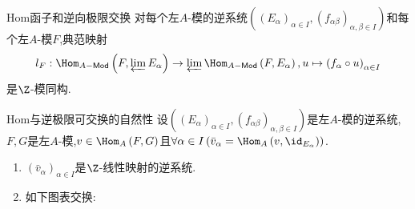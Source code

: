 \begin{proposition}{Hom函子和逆向极限交换}{}
	对每个左$A$-模的逆系统$\left(\left(E_{\alpha}\right)_{\alpha\in I},\left(f_{\alpha\beta}\right)_{\alpha,\beta\in I}\right)$和每个左$A$-模$F$,典范映射
	\begin{align*}
		l_{F}:\Hom_{A-\mathsf{Mod}}\left(F,\varprojlim E_{\alpha}\right)\to\varprojlim\Hom_{A-\mathsf{Mod}}\left(F,E_{\alpha}\right),u\mapsto\left(f_{\alpha}\circ u\right)_{\alpha\in I}
	\end{align*}
	是$\Z$-模同构.
\end{proposition}

\begin{corollary}{Hom与逆极限可交换的自然性}{}
	设$\left(\left(E_{\alpha}\right)_{\alpha\in I},\left(f_{\alpha\beta}\right)_{\alpha,\beta\in I}\right)$是左$A$-模的逆系统,$F,G$是左$A$-模,$v\in\Hom_{A}\left(F,G\right)$且$\forall\alpha\in I\left(\bar{v}_{\alpha}=\Hom_{A}\left(v,\id_{E_{\alpha}}\right)\right)$.
	\begin{enumerate}
		\item $\left(\bar{v}_{\alpha}\right)_{\alpha\in I}$是$\Z$-线性映射的逆系统.
		\item 如下图表交换:
		\begin{center}
		\end{center}
	\end{enumerate}
\end{corollary}















